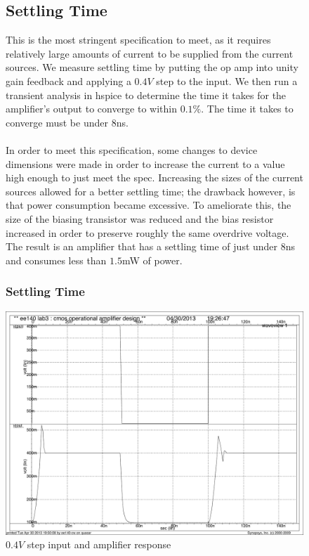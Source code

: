\documentclass[]{article}
\begin{document}
		\begin{figure}
			\subsection{Settling Time}
			This is the most stringent specification to meet, as it requires relatively large amounts of current to be supplied from the current sources. We measure settling time by putting the op amp into unity gain feedback and applying a $0.4V$ step to the input. We then run a transient analysis in hspice to determine the time it takes for the amplifier's output to converge to within $0.1\%$. The time it takes to converge must be under $8$ns.\\ \\
			In order to meet this specification, some changes to device dimensions were made in order to increase the current to a value high enough to just meet the spec. Increasing the sizes of the current sources allowed for a better settling time; the drawback however, is that power consumption became excessive. To ameliorate this, the size of the biasing transistor was reduced and the bias resistor increased in order to preserve roughly the same overdrive voltage. The result is an amplifier that has a settling time of just under $8$ns and consumes less than $1.5$mW of power.
				\subsubsection{Settling Time}
				\includegraphics[width=1.1\textwidth]{settling_time_zoomed_out.pdf}
				\caption{$0.4V$ step input and amplifier response}
		\end{figure}
		
\end{document}
